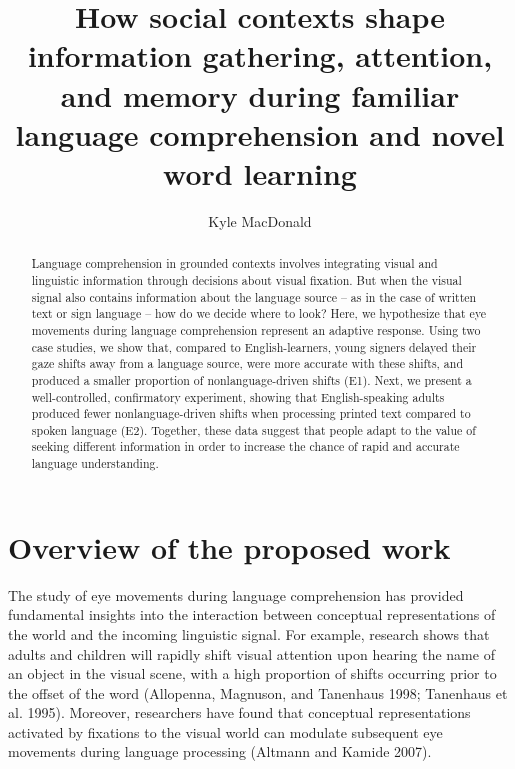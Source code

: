 \documentclass[]{elsarticle} %
\begin{document}
\begin{frontmatter}

  \title{How social contexts shape information gathering, attention, and memory
during familiar language comprehension and novel word learning}
    \author[Stanford University]{Kyle MacDonald}
    
  \begin{abstract}
  Language comprehension in grounded contexts involves integrating visual
  and linguistic information through decisions about visual fixation. But
  when the visual signal also contains information about the language
  source -- as in the case of written text or sign language -- how do we
  decide where to look? Here, we hypothesize that eye movements during
  language comprehension represent an adaptive response. Using two case
  studies, we show that, compared to English-learners, young signers
  delayed their gaze shifts away from a language source, were more
  accurate with these shifts, and produced a smaller proportion of
  nonlanguage-driven shifts (E1). Next, we present a well-controlled,
  confirmatory experiment, showing that English-speaking adults produced
  fewer nonlanguage-driven shifts when processing printed text compared to
  spoken language (E2). Together, these data suggest that people adapt to
  the value of seeking different information in order to increase the
  chance of rapid and accurate language understanding.
  \end{abstract}
  
 \end{frontmatter}

\section{Overview of the proposed
work}\label{overview-of-the-proposed-work}

The study of eye movements during language comprehension has provided
fundamental insights into the interaction between conceptual
representations of the world and the incoming linguistic signal. For
example, research shows that adults and children will rapidly shift
visual attention upon hearing the name of an object in the visual scene,
with a high proportion of shifts occurring prior to the offset of the
word (Allopenna, Magnuson, and Tanenhaus 1998; Tanenhaus et al. 1995).
Moreover, researchers have found that conceptual representations
activated by fixations to the visual world can modulate subsequent eye
movements during language processing (Altmann and Kamide 2007).
\end{document}
